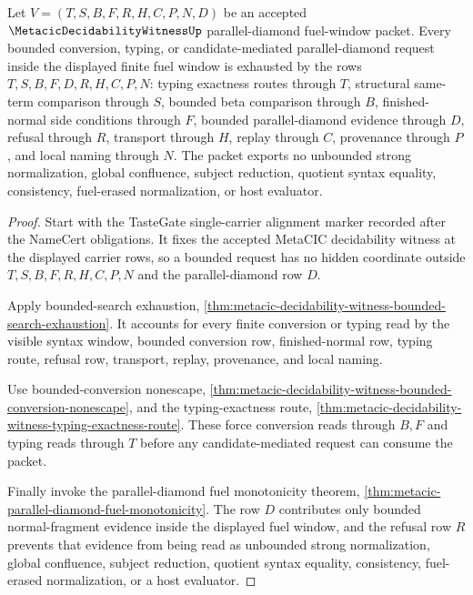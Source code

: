 \begin{theorem}
\label{thm:metacic-decidability-witness-fuel-window-exhaustion}
Let $V=(T,S,B,F,R,H,C,P,N,D)$ be an accepted $\MetacicDecidabilityWitnessUp$ parallel-diamond fuel-window packet. Every bounded conversion, typing, or candidate-mediated parallel-diamond request inside the displayed finite fuel window is exhausted by the rows $T,S,B,F,D,R,H,C,P,N$: typing exactness routes through $T$, structural same-term comparison through $S$, bounded beta comparison through $B$, finished-normal side conditions through $F$, bounded parallel-diamond evidence through $D$, refusal through $R$, transport through $H$, replay through $C$, provenance through $P$, and local naming through $N$. The packet exports no unbounded strong normalization, global confluence, subject reduction, quotient syntax equality, consistency, fuel-erased normalization, or host evaluator.
\end{theorem}
\begin{proof}
Start with the TasteGate single-carrier alignment marker recorded after the NameCert obligations. It fixes the accepted MetaCIC decidability witness at the displayed carrier rows, so a bounded request has no hidden coordinate outside $T,S,B,F,R,H,C,P,N$ and the parallel-diamond row $D$.

Apply bounded-search exhaustion, \autoref{thm:metacic-decidability-witness-bounded-search-exhaustion}. It accounts for every finite conversion or typing read by the visible syntax window, bounded conversion row, finished-normal row, typing route, refusal row, transport, replay, provenance, and local naming.

Use bounded-conversion nonescape, \autoref{thm:metacic-decidability-witness-bounded-conversion-nonescape}, and the typing-exactness route, \autoref{thm:metacic-decidability-witness-typing-exactness-route}. These force conversion reads through $B,F$ and typing reads through $T$ before any candidate-mediated request can consume the packet.

Finally invoke the parallel-diamond fuel monotonicity theorem, \autoref{thm:metacic-parallel-diamond-fuel-monotonicity}. The row $D$ contributes only bounded normal-fragment evidence inside the displayed fuel window, and the refusal row $R$ prevents that evidence from being read as unbounded strong normalization, global confluence, subject reduction, quotient syntax equality, consistency, fuel-erased normalization, or a host evaluator.
\end{proof}

